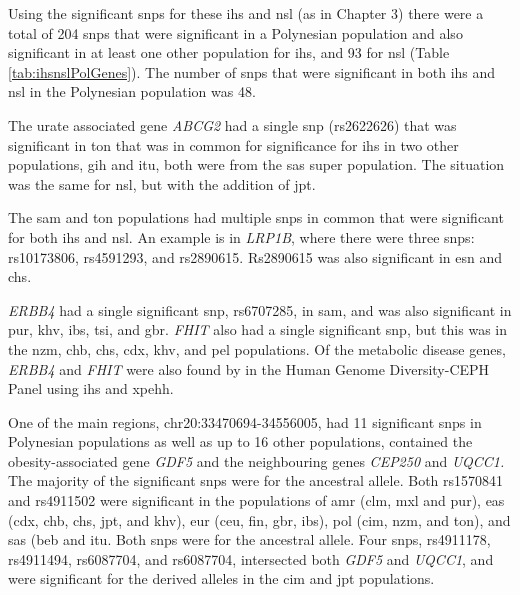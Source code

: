 \documentclass[]{report}
\begin{document}
Using the significant \glspl{snp} for these \gls{ihs} and \gls{nsl} (as
in Chapter 3) there were a total of 204 \glspl{snp} that were
significant in a Polynesian population and also significant in at least
one other population for \gls{ihs}, and 93 for \gls{nsl} (Table
\ref{tab:ihsnslPolGenes}). The number of \glspl{snp} that were
significant in both \gls{ihs} and \gls{nsl} in the Polynesian population
was 48.

The urate associated gene \emph{ABCG2} had a single \gls{snp}
(rs2622626) that was significant in \gls{ton} that was in common for
significance for \gls{ihs} in two other populations, \gls{gih} and
\gls{itu}, both were from the \gls{sas} super population. The situation
was the same for \gls{nsl}, but with the addition of \gls{jpt}.

The \gls{sam} and \gls{ton} populations had multiple \glspl{snp} in
common that were significant for both \gls{ihs} and \gls{nsl}. An
example is in \emph{LRP1B}, where there were three \glspl{snp}:
rs10173806, rs4591293, and rs2890615. Rs2890615 was also significant in
\gls{esn} and \gls{chs}.

\emph{ERBB4} had a single significant \gls{snp}, rs6707285, in
\gls{sam}, and was also significant in \gls{pur}, \gls{khv}, \gls{ibs},
\gls{tsi}, and \gls{gbr}. \emph{FHIT} also had a single significant
\gls{snp}, but this was in the \gls{nzm}, \gls{chb}, \gls{chs},
\gls{cdx}, \gls{khv}, and \gls{pel} populations. Of the metabolic
disease genes, \emph{ERBB4} and \emph{FHIT} were also found by
\citet{pickrell2009signals} in the Human Genome Diversity-CEPH Panel
using \gls{ihs} and \gls{xpehh}.

One of the main regions, chr20:33470694-34556005, had 11 significant
\glspl{snp} in Polynesian populations as well as up to 16 other
populations, contained the obesity-associated gene \emph{GDF5} and the
neighbouring genes \emph{CEP250} and \emph{UQCC1.} The majority of the
significant \glspl{snp} were for the ancestral allele. Both rs1570841
and rs4911502 were significant in the populations of \gls{amr}
(\gls{clm}, \gls{mxl} and \gls{pur}), \gls{eas} (\gls{cdx}, \gls{chb},
\gls{chs}, \gls{jpt}, and \gls{khv}), \gls{eur} (\gls{ceu}, \gls{fin},
\gls{gbr}, \gls{ibs}), \gls{pol} (\gls{cim}, \gls{nzm}, and \gls{ton}),
and \gls{sas} (\gls{beb} and \gls{itu}. Both \glspl{snp} were for the
ancestral allele. Four \glspl{snp}, rs4911178, rs4911494, rs6087704, and
rs6087704, intersected both \emph{GDF5} and \emph{UQCC1}, and were
significant for the derived alleles in the \gls{cim} and \gls{jpt}
populations.
\end{document}
